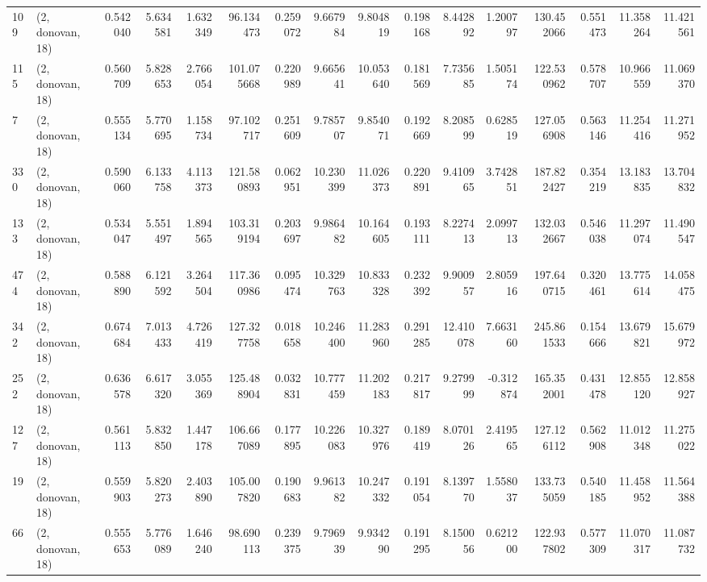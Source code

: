 \begin{tabular}{llrrrrrrrrrrrrrr}
109 &  (2, donovan, 18) &   0.542040 &   5.634581 &   1.632349 &    96.134473 &   0.259072 &   9.667984 &   9.804819 &  0.198168 &   8.442892 &   1.200797 &    130.452066 &   0.551473 &   11.358264 &   11.421561 \\
115 &  (2, donovan, 18) &   0.560709 &   5.828653 &   2.766054 &   101.075668 &   0.220989 &   9.665641 &  10.053640 &  0.181569 &   7.735685 &   1.505174 &    122.530962 &   0.578707 &   10.966559 &   11.069370 \\
7   &  (2, donovan, 18) &   0.555134 &   5.770695 &   1.158734 &    97.102717 &   0.251609 &   9.785707 &   9.854071 &  0.192669 &   8.208599 &   0.628519 &    127.056908 &   0.563146 &   11.254416 &   11.271952 \\
330 &  (2, donovan, 18) &   0.590060 &   6.133758 &   4.113373 &   121.580893 &   0.062951 &  10.230399 &  11.026373 &  0.220891 &   9.410965 &   3.742851 &    187.822427 &   0.354219 &   13.183835 &   13.704832 \\
133 &  (2, donovan, 18) &   0.534047 &   5.551497 &   1.894565 &   103.319194 &   0.203697 &   9.986482 &  10.164605 &  0.193111 &   8.227413 &   2.099713 &    132.032667 &   0.546038 &   11.297074 &   11.490547 \\
474 &  (2, donovan, 18) &   0.588890 &   6.121592 &   3.264504 &   117.360986 &   0.095474 &  10.329763 &  10.833328 &  0.232392 &   9.900957 &   2.805916 &    197.640715 &   0.320461 &   13.775614 &   14.058475 \\
342 &  (2, donovan, 18) &   0.674684 &   7.013433 &   4.726419 &   127.327758 &   0.018658 &  10.246400 &  11.283960 &  0.291285 &  12.410078 &   7.663160 &    245.861533 &   0.154666 &   13.679821 &   15.679972 \\
252 &  (2, donovan, 18) &   0.636578 &   6.617320 &   3.055369 &   125.488904 &   0.032831 &  10.777459 &  11.202183 &  0.217817 &   9.279999 &  -0.312874 &    165.352001 &   0.431478 &   12.855120 &   12.858927 \\
127 &  (2, donovan, 18) &   0.561113 &   5.832850 &   1.447178 &   106.667089 &   0.177895 &  10.226083 &  10.327976 &  0.189419 &   8.070126 &   2.419565 &    127.126112 &   0.562908 &   11.012348 &   11.275022 \\
19  &  (2, donovan, 18) &   0.559903 &   5.820273 &   2.403890 &   105.007820 &   0.190683 &   9.961382 &  10.247332 &  0.191054 &   8.139770 &   1.558037 &    133.735059 &   0.540185 &   11.458952 &   11.564388 \\
66  &  (2, donovan, 18) &   0.555653 &   5.776089 &   1.646240 &    98.690113 &   0.239375 &   9.796939 &   9.934290 &  0.191295 &   8.150056 &   0.621200 &    122.937802 &   0.577309 &   11.070317 &   11.087732 \\

\end{tabular}
